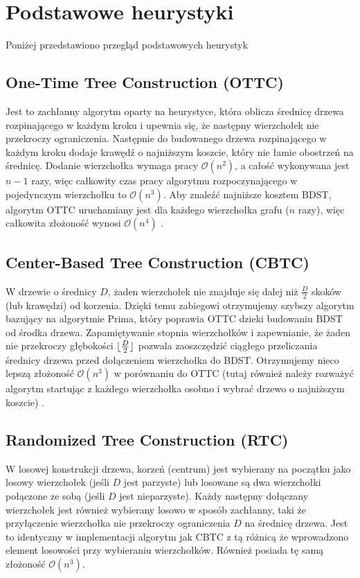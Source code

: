 \section{Podstawowe heurystyki}
Poniżej przedstawiono przegląd podstawowych heurystyk

\subsection{One-Time Tree Construction (OTTC)}

Jest to zachłanny algorytm oparty na heurystyce, która oblicza średnicę drzewa rozpinającego w każdym kroku i upewnia się, że następny wierzchołek nie przekroczy ograniczenia. Następnie do budowanego drzewa rozpinającego w każdym kroku dodaje krawędź o najniższym koszcie, który nie łamie obostrzeń na średnicę. Dodanie wierzchołka wymaga pracy $\mathcal{O}(n^2)$, a całość wykonywana jest $n-1$ razy, więc całkowity czas pracy algorytmu rozpoczynającego w pojedynczym wierzchołku to $\mathcal{O}(n^3)$. Aby znaleźć najniższe kosztem BDST, algorytm OTTC uruchamiany jest dla każdego wierzchołka grafu ($n$ razy), więc całkowita złożoność wynosi $\mathcal{O}(n^4)$ \cite{DBLP:conf/ciac/DeoA00}.

\subsection{Center-Based Tree Construction (CBTC)}
W drzewie o średnicy $D$, żaden wierzchołek nie znajduje się dalej niż $\frac{D}{2}$ skoków (lub krawędzi) od korzenia. Dzięki temu zabiegowi otrzymujemy szybszy algorytm bazujący na algorytmie Prima, który poprawia OTTC dzieki budowaniu BDST od środka drzewa. Zapamiętywanie stopnia wierzchołków i zapewnianie, że żaden nie przekroczy głębokości $\lfloor\frac{D}{2}\rfloor$ pozwala zaoszczędzić ciągłego przeliczania średnicy drzewa przed dołączeniem wierzchołka do BDST. Otrzymujemy nieco lepszą złożoność $\mathcal{O}(n^3)$ w porównaniu do OTTC (tutaj również należy rozważyć algorytm startując z każdego wierzchołka osobno i wybrać drzewo o najniższym koszcie) \cite{DBLP:journals/jea/Julstrom09}.

\subsection{Randomized Tree Construction (RTC)}
W losowej konstrukcji drzewa, korzeń (centrum) jest wybierany na początku jako losowy wierzchołek (jeśli $D$ jest parzyste) lub losowane są dwa wierzchołki połączone ze sobą (jeśli $D$ jest nieparzyste). Każdy następny dołączany wierzchołek jest również wybierany losowo w sposób zachłanny, taki że przyłączenie wierzchołka nie przekroczy ograniczenia $D$ na średnicę drzewa. Jest to identyczny w implementacji algorytm jak CBTC z tą różnicą że wprowadzono element losowości przy wybieraniu wierzchołków. Również posiada tę samą złożoność $\mathcal{O}(n^3)$.

